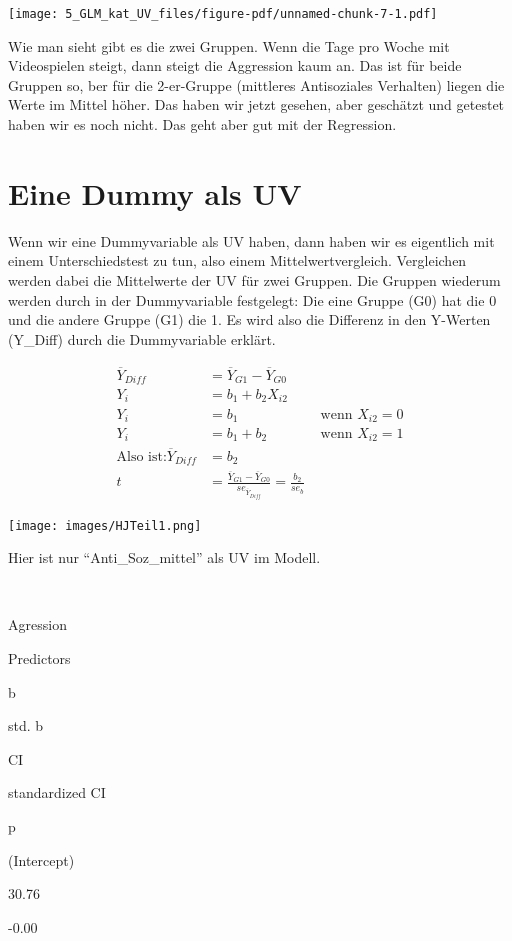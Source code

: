 \documentclass[
  10pt,
  letterpaper,
  a4paper, twoside]{scrreprt}
\begin{document}
\texttt{[image: 5\_GLM\_kat\_UV\_files/figure-pdf/unnamed-chunk-7-1.pdf]}

Wie man sieht gibt es die zwei Gruppen. Wenn die Tage pro Woche mit
Videospielen steigt, dann steigt die Aggression kaum an. Das ist für
beide Gruppen so, ber für die 2-er-Gruppe (mittleres Antisoziales
Verhalten) liegen die Werte im Mittel höher. Das haben wir jetzt
gesehen, aber geschätzt und getestet haben wir es noch nicht. Das geht
aber gut mit der Regression.

\section{Eine Dummy als UV}\label{eine-dummy-als-uv}

Wenn wir eine Dummyvariable als UV haben, dann haben wir es eigentlich
mit einem Unterschiedstest zu tun, also einem Mittelwertvergleich.
Vergleichen werden dabei die Mittelwerte der UV für zwei Gruppen. Die
Gruppen wiederum werden durch in der Dummyvariable festgelegt: Die eine
Gruppe (G0) hat die 0 und die andere Gruppe (G1) die 1. Es wird also die
Differenz in den Y-Werten (Y\_Diff) durch die Dummyvariable erklärt.

\begin{align}
\overline{Y}_{Diff}&=\overline{Y}_{G1}-\overline{Y}_{G0}&\\
      Y_i&=b_1 + b_2X_{i2}\\
      Y_i&=b_1 &\text{ wenn } X_{i2}=0\\
      Y_i&=b_1  + b_2 &\text{ wenn } X_{i2}=1\\
  \text{Also ist:}\overline{Y}_{Diff}&=b_2\\
  t&=\frac{\overline{Y}_{G1}-\overline{Y}_{G0}}{se_{\overline{Y}_{Diff}}}=\frac{b_2}{se_b}
\end{align}

\texttt{[image: images/HJTeil1.png]}

Hier ist nur \enquote{Anti\_Soz\_mittel} als UV im Modell.

~

Agression

Predictors

b

std. b

CI

standardized CI

p

(Intercept)

30.76

-0.00
\end{document}
